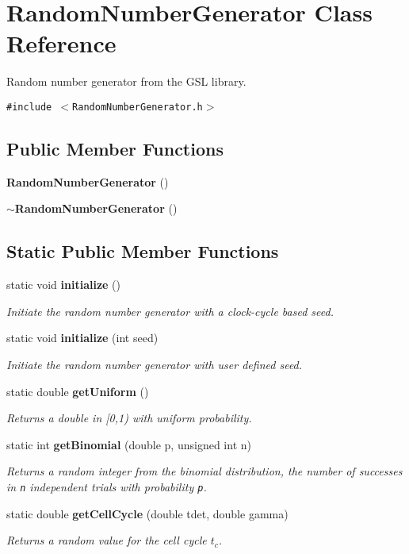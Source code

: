 \section{RandomNumberGenerator Class Reference}
\label{classRandomNumberGenerator}
Random number generator from the GSL library.  


{\tt \#include $<$RandomNumberGenerator.h$>$}

\subsection*{Public Member Functions}
\begin{CompactItemize}
\item 
{\bf RandomNumberGenerator} ()
\item 
{\bf $\sim$RandomNumberGenerator} ()
\end{CompactItemize}
\subsection*{Static Public Member Functions}
\begin{CompactItemize}
\item 
static void {\bf initialize} ()
\begin{CompactList}\small\item\em Initiate the random number generator with a clock-cycle based seed. \item\end{CompactList}\item 
static void {\bf initialize} (int seed)
\begin{CompactList}\small\item\em Initiate the random number generator with user defined seed. \item\end{CompactList}\item 
static double {\bf getUniform} ()
\begin{CompactList}\small\item\em Returns a double in [0,1) with uniform probability. \item\end{CompactList}\item 
static int {\bf getBinomial} (double p, unsigned int n)
\begin{CompactList}\small\item\em Returns a random integer from the binomial distribution, the number of successes in {\tt n} independent trials with probability {\tt p}. \item\end{CompactList}\item 
static double {\bf getCellCycle} (double tdet, double gamma)
\begin{CompactList}\small\item\em Returns a random value for the cell cycle $t_c$. \item\end{CompactList}\end{CompactItemize}
